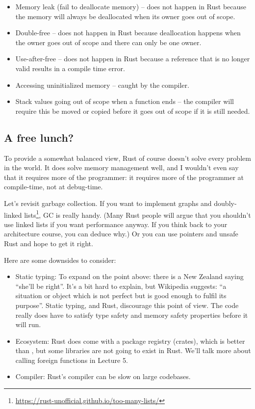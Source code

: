 \begin{itemize}
	\item Memory leak (fail to deallocate memory) -- does not happen in Rust because the memory will always be deallocated when its owner goes out of scope.
	\item Double-free -- does not happen in Rust because deallocation happens when the owner goes out of scope and there can only be one owner.
	\item Use-after-free -- does not happen in Rust because a reference that is no longer valid results in a compile time error.
	\item Accessing uninitialized memory -- caught by the compiler.
	\item Stack values going out of scope when a function ends -- the compiler will require this be moved or copied before it goes out of scope if it is still needed.
\end{itemize}

\subsection*{A free lunch?}
To provide a somewhat balanced view, Rust of course doesn't solve every problem
in the world. It does solve memory management well, and I wouldn't even say that
it requires more of the programmer: it requires more of the programmer at compile-time,
not at debug-time.

Let's revisit garbage collection. If you want
to implement graphs and doubly-linked lists\footnote{\url{https://rust-unofficial.github.io/too-many-lists/}}, GC is really handy. (Many
Rust people will argue that you shouldn't use linked lists if you want
performance anyway. If you think back to your architecture course, you
can deduce why.) Or you can use pointers and unsafe Rust and hope to
get it right.


Here are some downsides to consider:
\begin{itemize}
\item Static typing: To expand on the point above: there is a New Zealand saying ``she'll be right''. It's a bit hard to explain, but Wikipedia suggests: ``a situation or object which is not perfect but is good enough to fulfil its purpose''. Static typing, and Rust, discourage this point of view. The code really does have to satisfy type safety and memory safety properties before it will run.
\item Ecosystem: Rust does come with a package registry (crates), which is better than \CPP, but some libraries are not going to exist in Rust. We'll talk more about calling foreign functions in Lecture 5.
\item Compiler: Rust's compiler can be slow on large codebases.
\end{itemize}





